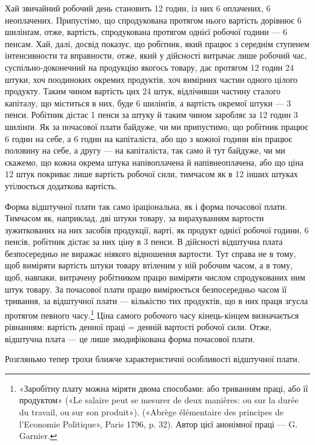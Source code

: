 Хай звичайний робочий день становить 12 годин, із них 6
оплачених, 6 неоплачених. Припустімо, що спродукована протягом
нього вартість дорівнює 6 шилінґам, отже, вартість, спродукована
протягом однієї робочої години — 6 пенсам. Хай,
далі, досвід показує, що робітник, який працює з середнім
ступенем інтенсивности та вправности, отже, який у дійсності
витрачає лише робочий час, суспільно-доконечний на продукцію
якогось товару, дає протягом 12 годин 24 штуки, хоч поодиноких
окремих продуктів, хоч вимірних частин одного цілого продукту.
Таким чином вартість цих 24 штук, відлічивши частину
сталого капіталу, що міститься в них, буде 6 шилінґів, а вартість
окремої штуки — 3 пенси. Робітник дістає 1 пенси за
штуку й таким чином заробляє за 12 годин 3 шилінґи. Як за
почасової плати байдуже, чи ми припустимо, що робітник працює
6 годин на себе, а 6 годин на капіталіста, або що з кожної години
він працює половину на себе, а другу — на капіталіста, так само
й тут байдуже, чи ми скажемо, що кожна окрема штука напівоплачена
й напівнеоплачена, або що ціна 12 штук покриває лише
вартість робочої сили, тимчасом як в 12 інших штуках утілюється
додаткова вартість.

Форма відштучної плати так само іраціональна, як і форма
почасової плати. Тимчасом як, наприклад, дві штуки товару,
за вирахуванням вартости зужиткованих на них засобів продукції,
варті, як продукт однієї робочої години, 6 пенсів, робітник дістає
за них ціну в 3 пенси. В дійсності відштучна плата безпосередньо
не виражає ніякого відношення вартости. Тут справа не в тому,
щоб виміряти вартість штуки товару втіленим у ній робочим
часом, а в тому, щоб, навпаки, витрачену робітником працю виміряти
числом спродукованих ним штук товару. За почасової
плати працю вимірюється безпосередньо часом її тривання, за
відштучної плати — кількістю тих продуктів, що в них праця
згусла протягом певного часу.\footnote{
«Заробітну плату можна міряти двома способами: або триванням
праці, або її продуктом» («Le salaire peut se mesurer de deux manières:
ou sur la durée du travail, ou sur son produit»). («Abrège élémentaire des
principes de l’Economie Politique», Paris 1796, p. 32). Автор цієї анонімної
праці — G. Garnier.
} Ціна самого робочого часу кінець-кінцем
визначається рівнанням: вартість денної праці =
денній вартості робочої сили. Отже, відштучна плата — це лише
змодифікована форма почасової плати.

Розгляньмо тепер трохи ближче характеристичні особливості
відштучної плати.

